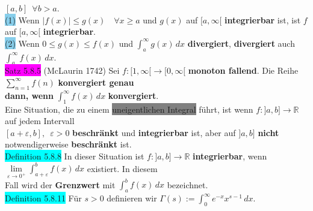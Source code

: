 \documentclass[10pt]{article}
\begin{document}
                \textcolor{NavyBlue}{$[a,b]\enspace\forall b>a$}. \\
        \indent \colorbox{SkyBlue}{(1)} Wenn 
                \textcolor{NavyBlue}{$|f(x)|\leqslant g(x)\quad\forall x\geqslant a$}
                und \textcolor{NavyBlue}{$g(x)$} auf \textcolor{NavyBlue}{$[a,\infty[$} 
                \textbf{integrierbar} ist, ist 
                \textcolor{NavyBlue}{$f$} auf \textcolor{NavyBlue}{$[a,\infty[$}
                \textbf{integrierbar}. \\
        \indent \colorbox{SkyBlue}{(2)} Wenn 
                \textcolor{NavyBlue}{$0\leqslant g(x)\leqslant f(x)$} 
                und \textcolor{NavyBlue}{$\int_a^\infty g(x)\,dx$} 
                \textbf{divergiert}, \textbf{divergiert} auch 
                \textcolor{NavyBlue}{$\int_a^\infty f(x)\,dx$}.\\
\colorbox{magenta}{Satz 5.8.5} (McLaurin 1742) Sei 
                \textcolor{NavyBlue}{$f:[1,\infty[\longrightarrow[0,\infty[$} 
                \textbf{monoton fallend}. Die Reihe 
                \textcolor{NavyBlue}{$\sum_{n=1}^\infty f(n)$} \textbf{konvergiert genau \\
        \indent dann, wenn} \textcolor{NavyBlue}{$\int_1^\infty f(x)\,dx$} 
                \textbf{konvergiert}. \\
Eine Situation, die zu einem \colorbox{gray}{uneigentlichen Integral} führt, 
                ist wenn \textcolor{NavyBlue}{$f:]a,b]\longrightarrow\mathbb{R}$} 
                auf jedem Intervall \\
        \indent \textcolor{NavyBlue}{$[a+\varepsilon,b],\enspace\varepsilon>0$} 
                \textbf{beschränkt} und \textbf{integrierbar} ist, aber auf 
                \textcolor{NavyBlue}{$]a,b]$} \textbf{nicht} notwendigerweise 
                \textbf{beschränkt} ist. \\
\colorbox{cyan}{Definition 5.8.8} In dieser Situation ist 
                \textcolor{NavyBlue}{$f:]a,b]\longrightarrow\mathbb{R}$} 
                \textbf{integrierbar}, wenn 
                \textcolor{NavyBlue}{
                $\lim\limits_{\varepsilon\to0^+}\int_{a+\varepsilon}^bf(x)\,dx$} existiert.
                In diesem \\
        \indent Fall wird der \textbf{Grenzwert} mit 
                \textcolor{NavyBlue}{$\int_a^bf(x)\,dx$} bezeichnet. \\
\colorbox{cyan}{Definition 5.8.11} Für \textcolor{NavyBlue}{$s>0$} definieren wir 
                \textcolor{NavyBlue}{$\Gamma(s):=\int_0^\infty e^{-x}x^{s-1}\,dx$}. \\
\end{document}
